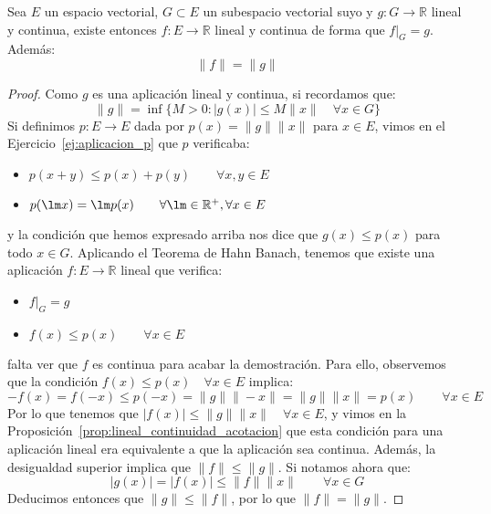 \begin{coro}
    Sea $E$ un espacio vectorial, $G\subset E$ un subespacio vectorial suyo y $g:G\to \mathbb{R}$ lineal y continua, existe entonces $f:E\to \mathbb{R}$ lineal y continua de forma que $f\big|_G = g$. Además:
    \begin{equation*}
        \|f\| = \|g\|
    \end{equation*}
    \begin{proof}
        Como $g$ es una aplicación lineal y continua, si recordamos que:
        \begin{equation*}
            \|g\| = \inf \{M>0 : |g(x)| \leq M\|x\| \quad \forall x\in G\}
        \end{equation*}
        Si definimos $p:E\to E$ dada por $p(x) = \|g\|\|x\|$ para $x\in E$, vimos en el Ejercicio~\ref{ej:aplicacion_p} que $p$ verificaba:
        \begin{itemize}
            \item $p(x+y)\leq p(x) + p(y) \qquad \forall x,y\in E$
            \item $p(\lm x)=\lm p(x) \qquad \forall \lm \in \mathbb{R}^+, \forall x\in E$
        \end{itemize}
        y la condición que hemos expresado arriba nos dice que $g(x) \leq p(x)$ para todo $x\in G$. Aplicando el Teorema de Hahn Banach, tenemos que existe una aplicación $f:E\to \mathbb{R}$ lineal que verifica:
        \begin{itemize}
            \item $f\big|_G = g$
            \item $f(x) \leq p(x)\qquad \forall x\in E$
        \end{itemize}
        falta ver que $f$ es continua para acabar la demostración. Para ello, observemos que la condición $f(x) \leq p(x) \quad \forall x\in E$ implica:
        \begin{equation*}
            -f(x) = f(-x) \leq p(-x) = \|g\|\|- x\| = \|g\|\|x\| = p(x) \qquad \forall x\in E
        \end{equation*}
        Por lo que tenemos que $|f(x)| \leq \|g\|\|x\| \quad \forall x\in E$, y vimos en la Proposición~\ref{prop:lineal_continuidad_acotacion} que esta condición para una aplicación lineal era equivalente a que la aplicación sea continua. Además, la desigualdad superior implica que $\|f\| \leq \|g\|$. Si notamos ahora que:
        \begin{equation*}
            |g(x)| = |f(x)| \leq \|f\| \|x\| \qquad \forall x\in G
        \end{equation*}
        Deducimos entonces que $\|g\| \leq \|f\|$, por lo que $\|f\| = \|g\|$.
    \end{proof}
\end{coro}

